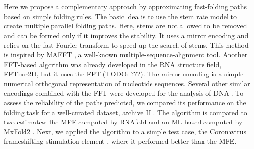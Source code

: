 \documentclass[a4paper,12pt]{article}
\begin{document}
Here we propose a complementary approach by approximating fast-folding paths
based on simple folding rules. The basic idea is to use the stem rate model to
create multiple parallel folding paths. Here, stems are not allowed to be
removed and can be formed only if it improves the stability. It uses a mirror
encoding and relies on the fast Fourier transform to speed up the search of
stems. This method is inspired by MAFFT \cite{katoh02_mafft}, a well-known
multiple-sequence-alignment tool. Another FFT-based algorithm was already
developed in the RNA structure field, FFTbor2D, but it uses the FFT (TODO: ???).
The mirror encoding is a simple numerical orthogonal representation of
nucleotide sequences. Several other similar encodings combined with the FFT were
developed for the analysis of DNA
\cite{felsenstein82_effic_method_match_nucleic_acid_sequen}. To assess the
reliability of the paths predicted, we compared its performance on the folding
task for a well-curated dataset, archive II
\cite{mathews19_how_to_bench_rna_secon}. The algorithm is compared to two
estimates: the MFE computed by RNAfold and an ML-based computed by MxFold2
\cite{sato20_rna}. Next, we applied the algorithm to a simple test case, the
Coronavirus frameshifting stimulation element
\cite{baranov05_progr_ribos_frames_decod_sars_cov_genom}, where it performed
better than the MFE.
\end{document}
